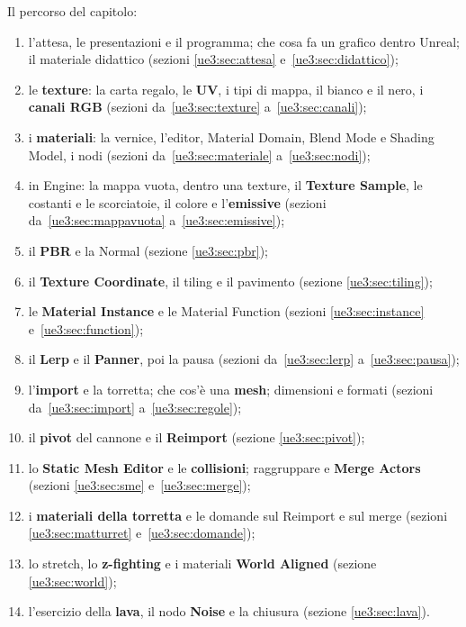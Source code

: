Il percorso del capitolo:
\begin{enumerate}
  \item l'attesa, le presentazioni e il programma; che cosa fa un grafico dentro
        Unreal; il materiale didattico (sezioni \ref{ue3:sec:attesa}
        e~\ref{ue3:sec:didattico});
  \item le \textbf{texture}: la carta regalo, le \textbf{UV}, i tipi di mappa, il
        bianco e il nero, i \textbf{canali RGB} (sezioni da~\ref{ue3:sec:texture}
        a~\ref{ue3:sec:canali});
  \item i \textbf{materiali}: la vernice, l'editor, Material Domain, Blend Mode e
        Shading Model, i nodi (sezioni da~\ref{ue3:sec:materiale}
        a~\ref{ue3:sec:nodi});
  \item in Engine: la mappa vuota, dentro una texture, il \textbf{Texture Sample}, le
        costanti e le scorciatoie, il colore e l'\textbf{emissive} (sezioni
        da~\ref{ue3:sec:mappavuota} a~\ref{ue3:sec:emissive});
  \item il \textbf{PBR} e la Normal (sezione \ref{ue3:sec:pbr});
  \item il \textbf{Texture Coordinate}, il tiling e il pavimento (sezione
        \ref{ue3:sec:tiling});
  \item le \textbf{Material Instance} e le Material Function (sezioni
        \ref{ue3:sec:instance} e~\ref{ue3:sec:function});
  \item il \textbf{Lerp} e il \textbf{Panner}, poi la pausa (sezioni
        da~\ref{ue3:sec:lerp} a~\ref{ue3:sec:pausa});
  \item l'\textbf{import} e la torretta; che cos'è una \textbf{mesh}; dimensioni e
        formati (sezioni da~\ref{ue3:sec:import} a~\ref{ue3:sec:regole});
  \item il \textbf{pivot} del cannone e il \textbf{Reimport} (sezione
        \ref{ue3:sec:pivot});
  \item lo \textbf{Static Mesh Editor} e le \textbf{collisioni}; raggruppare e
        \textbf{Merge Actors} (sezioni \ref{ue3:sec:sme} e~\ref{ue3:sec:merge});
  \item i \textbf{materiali della torretta} e le domande sul Reimport e sul merge
        (sezioni \ref{ue3:sec:matturret} e~\ref{ue3:sec:domande});
  \item lo stretch, lo \textbf{z-fighting} e i materiali \textbf{World Aligned}
        (sezione \ref{ue3:sec:world});
  \item l'esercizio della \textbf{lava}, il nodo \textbf{Noise} e la chiusura
        (sezione \ref{ue3:sec:lava}).
\end{enumerate}

